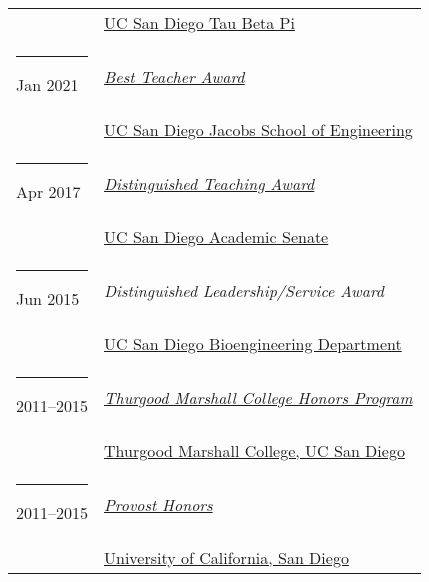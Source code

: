 \documentclass[margin,line]{res}
\begin{document}
\begin{resume}
\begin{longtable}{@{}p{0.7in}p{4in}}
\hspace*{-4mm} \hspace*{-4mm} & \hspace{4mm} \href{https://tbp.ucsd.edu/home}{UC San Diego Tau Beta Pi}\\
\hspace*{-4mm} \rule{-1mm}{5mm} Jan 2021 & \href{https://jacobsschool.ucsd.edu/faculty/best-teacher-awards}{\textit{Best Teacher Award}}\\*
\hspace*{-4mm} \hspace*{-4mm} & \hspace{4mm} \href{https://jacobsschool.ucsd.edu/}{UC San Diego Jacobs School of Engineering}\\
\hspace*{-4mm} \rule{-1mm}{5mm} Apr 2017 & \href{https://senate.ucsd.edu/grants-awards/senate-awards/distinguished-teaching-award/recipient-history}{\textit{Distinguished Teaching Award}}\\*
\hspace*{-4mm} \hspace*{-4mm} & \hspace{4mm} \href{https://senate.ucsd.edu/}{UC San Diego Academic Senate}\\
\hspace*{-4mm} \rule{-1mm}{5mm} Jun 2015 & \textit{Distinguished Leadership/Service Award}\\*
\hspace*{-4mm} \hspace*{-4mm} & \hspace{4mm} \href{http://bioengineering.ucsd.edu/}{UC San Diego Bioengineering Department}\\
\hspace*{-4mm} \rule{-1mm}{5mm} 2011--2015 & \href{https://marshall.ucsd.edu/academics/academic-opportunities/tmc-honors-program.html}{\textit{Thurgood Marshall College Honors Program}}\\*
\hspace*{-4mm} \hspace*{-4mm} & \hspace{4mm} \href{https://marshall.ucsd.edu/}{Thurgood Marshall College, UC San Diego}\\
\hspace*{-4mm} \rule{-1mm}{5mm} 2011--2015 & \href{https://roosevelt.ucsd.edu/academics/Academic\%20Opportunities/honors/index.html#Provost-Honors}{\textit{Provost Honors}}\\*
\hspace*{-4mm} \hspace*{-4mm} & \hspace{4mm} \href{http://ucsd.edu/}{University of California, San Diego}\\
\end{longtable}


\end{resume}
\end{document}
